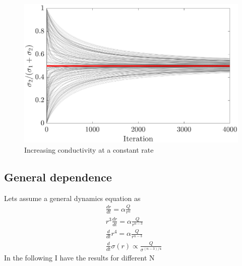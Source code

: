 \begin{figure}[h]
 \centerline{\includegraphics[width=.75\textwidth]{./Figs/shear-iterations}}
\caption{Increasing conductivity at a constant rate}
\label{sup-fig4}
\end{figure}  



\subsection{General dependence}
%
Lets assume a general dynamics equation as
%
\begin{align}
  & \frac{dr}{dt}  = \alpha \frac{Q}{r^{n}} \\
  & r^3 \frac{d r}{d t}   = \alpha \frac{Q}{r^{n-3}}  \\
  & \frac{d}{dt} r^4 = \alpha \frac{Q}{r^{n-3}} \\ 
  & \boxed{\frac{d}{dt} \sigma(r) \propto \frac{Q}{\sigma^{(n-3)/4}}   }
\end{align}
%
In the following I have the results for different N
%




